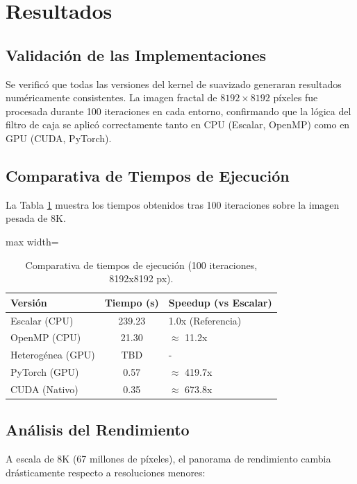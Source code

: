 \section{Resultados}

\subsection{Validación de las Implementaciones}
Se verificó que todas las versiones del kernel de suavizado generaran resultados numéricamente consistentes. La imagen fractal de $8192 \times 8192$ píxeles fue procesada durante 100 iteraciones en cada entorno, confirmando que la lógica del filtro de caja se aplicó correctamente tanto en CPU (Escalar, OpenMP) como en GPU (CUDA, PyTorch).

\subsection{Comparativa de Tiempos de Ejecución}
La Tabla \ref{tab:tiempos} muestra los tiempos obtenidos tras 100 iteraciones sobre la imagen pesada de 8K.

\begin{table}[htb]
\centering
\caption{Comparativa de tiempos de ejecución (100 iteraciones, 8192x8192 px).}
\label{tab:tiempos}
\begin{adjustbox}{max width=\columnwidth}
\begin{tabular}{|l|c|l|}\hline
\textbf{Versión} & \textbf{Tiempo (s)} & \textbf{Speedup (vs Escalar)} \\ \hline
Escalar (CPU)    & 239.23              & 1.0x (Referencia) \\ \hline
OpenMP (CPU)     & 21.30               & $\approx$ 11.2x \\ \hline
Heterogénea (GPU) & TBD                & - \\ \hline
PyTorch (GPU)    & 0.57                & $\approx$ 419.7x \\ \hline
CUDA (Nativo)    & 0.35                & $\approx$ 673.8x \\ \hline
\end{tabular}
\end{adjustbox}
\end{table}

\subsection{Análisis del Rendimiento}
A escala de 8K (67 millones de píxeles), el panorama de rendimiento cambia drásticamente respecto a resoluciones menores:

